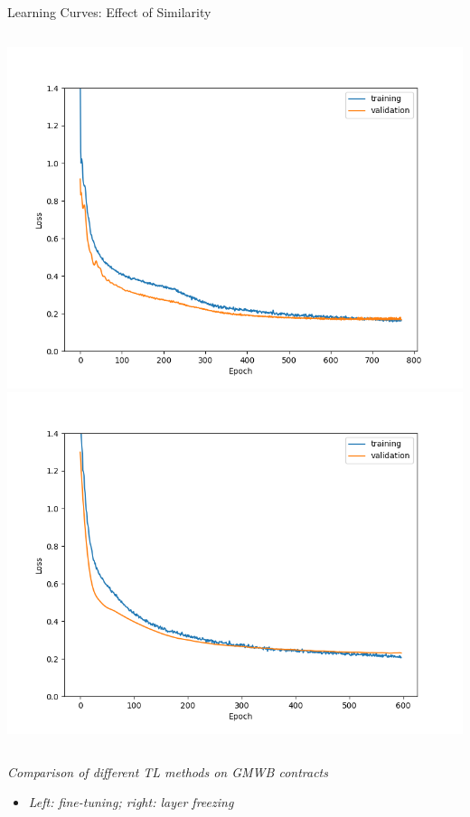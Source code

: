     \begin{frame}{Learning Curves: Effect of Similarity}
    \begin{columns}
    \includegraphics[height=0.8\textheight]{../project3/figures/figure4c.png}
    \includegraphics[height=0.8\textheight]{../project3/figures/figure4d.png}
    \end{columns}
    
    \textit{Comparison of different TL methods on GMWB contracts}
    \begin{itemize}
        \item \textit{Left: fine-tuning; right: layer freezing}
    \end{itemize}
    \end{frame}
    
